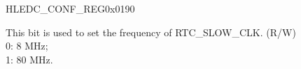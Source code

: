 \begin{register}{H}{LEDC\_CONF\_REG}{0x0190}\label{regdesc:LEDCCONFREG}
%
%
\regnewline%
\begin{regdesc}\begin{reglist}
\item [LEDC\_APB\_CLK\_SEL]This bit is used to set the frequency of RTC\_SLOW\_CLK. (R/W) \\
0: 8 MHz; \\
1: 80 MHz.
\end{reglist}\end{regdesc}
\end{register}
